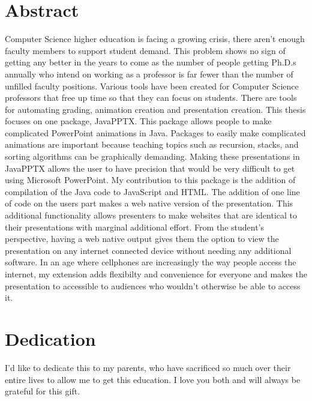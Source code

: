 \documentclass[12pt,twoside]{reedthesis}
\begin{document}
    \chapter*{Abstract}
	Computer Science higher education is facing a growing crisis, there aren't enough faculty members to support student demand. This problem shows no sign of getting any better in the years to come as the number of people getting Ph.D.s annually who intend on working as a professor is far fewer than the number of unfilled faculty positions. Various tools have been created for Computer Science professors that free up time so that they can focus on students. There are tools for automating grading, animation creation and presentation creation. This thesis focuses on one package, JavaPPTX. This package allows people to make complicated PowerPoint animations in Java. Packages to easily make complicated animations are important because teaching topics such as recursion, stacks, and sorting algorithms  can be graphically demanding. Making these presentations in JavaPPTX allows the user to have precision that would be very difficult to get using Microsoft PowerPoint. My contribution to this package is the addition of compilation of the Java code to JavaScript and HTML. The addition of one line of code on the users part makes a web native version of the presentation. This additional functionality allows presenters to make websites that are identical to their presentations with marginal additional effort. From the student's perspective, having a web native output gives them the option to view the presentation on any internet connected device without needing any additional software. In an age where cellphones are increasingly the way people access the internet, my extension adds flexibilty and convenience for everyone and makes the presentation to accessible to audiences who wouldn't otherwise be able to access it. 
	
	\chapter*{Dedication}
	I'd like to dedicate this to my parents, who have sacrificed so much over their entire lives to allow me to get this education. I love you both and will always be grateful for this gift. 

  \mainmatter %
  \pagestyle{fancyplain} %
\end{document}
